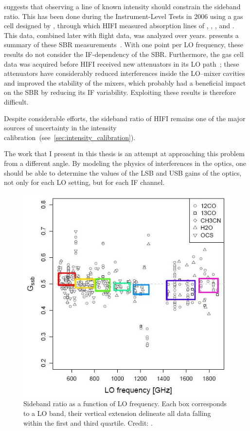  suggests that observing a line of known intensity should constrain the sideband ratio.
This has been done during the Instrument-Level Tests in 2006 using a gas cell designed by \textcite{teyssier2004multi}, through which HIFI measured absorption lines of , , ,  and .
This data, combined later with flight data, was analyzed over years.
 presents a summary of these SBR measurements~\parencite{higgins2010calibration,higgins2014effect}.
With one point per LO frequency, these results do not consider the IF-dependency of the SBR.
Furthermore, the gas cell data was acquired before HIFI received new attenuators in its LO path~\parencite{jellema2008flight}; these attenuators have considerably reduced interferences inside the LO--mixer cavities and improved the stability of the mixers, which probably had a beneficial impact on the SBR by reducing its IF variability.
Exploiting these results is therefore difficult.

Despite considerable efforts, the sideband ratio of HIFI remains one of the major sources of uncertainty in the intensity calibration~(see~\cref{sec:intensity_calibration}).

The work that I present in this thesis is an attempt at approaching this problem from a different angle.
By modeling the physics of interferences in the optics, one should be able to determine the values of the LSB and USB gains of the optics, not only for each LO setting, but for each IF channel.

\begin{figure}[hbp]
    \centering
    \includegraphics[width=.75\textwidth]{sideband_ratio}
    \caption{
        Sideband ratio as a function of LO frequency.
        Each box corresponds to a LO band, their vertical extension delineate all data falling within the first and third quartile.
        Credit: \textcite{higgins2014effect}.
    }
    \label{fig:sideband_ratio}
\end{figure}


